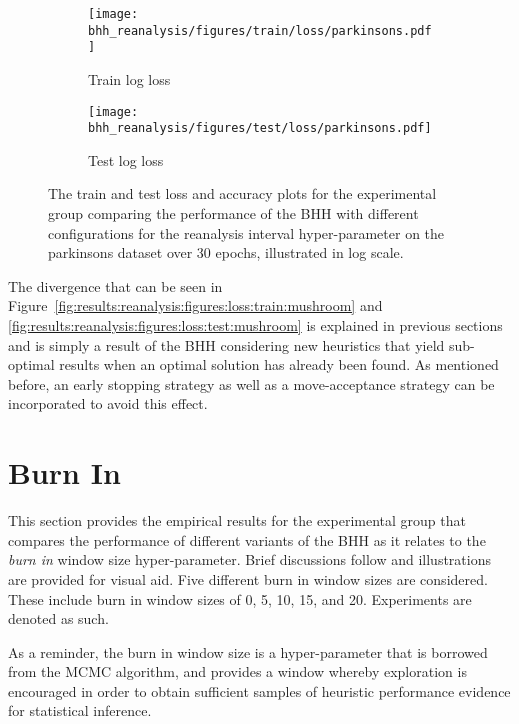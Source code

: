\begin{figure}[htb]
      \begin{subfigure}{0.5\textwidth}
            \centering
            \texttt{[image: bhh\_reanalysis/figures/train/loss/parkinsons.pdf]}
            \caption{Train log loss}
            \label{fig:results:reanalysis:figures:loss:train:parkinsons}
      \end{subfigure}
      \begin{subfigure}{0.5\textwidth}
            \centering
            \texttt{[image: bhh\_reanalysis/figures/test/loss/parkinsons.pdf]}
            \caption{Test log loss}
            \label{fig:results:reanalysis:figures:loss:test:parkinsons}
      \end{subfigure}
      \par\bigskip
      \caption{The train and test loss and accuracy plots for the experimental group comparing the performance of the \acs{BHH} with different configurations for the reanalysis interval hyper-parameter on the parkinsons dataset over 30 epochs, illustrated in log scale.}
      \label{fig:results:reanalysis:figures:parkinsons}
\end{figure}

The divergence that can be seen in Figure~\ref{fig:results:reanalysis:figures:loss:train:mushroom} and \ref{fig:results:reanalysis:figures:loss:test:mushroom} is explained in previous sections and is simply a result of the \acs{BHH} considering new heuristics that yield sub-optimal results when an optimal solution has already been found. As mentioned before, an early stopping strategy as well as a move-acceptance strategy can be incorporated to avoid this effect.

\section{Burn In}\label{sec:results:burn_in}

This section provides the empirical results for the experimental group that compares the performance of different variants of the \acs{BHH} as it relates to the \textit{burn in} window size hyper-parameter. Brief discussions follow and illustrations are provided for visual aid. Five different burn in window sizes are considered. These include burn in window sizes of 0, 5, 10, 15, and 20. Experiments are denoted as such.

As a reminder, the burn in window size is a hyper-parameter that is borrowed from the \acs{MCMC} algorithm, and provides a window whereby exploration is encouraged in order to obtain sufficient samples of heuristic performance evidence for statistical inference.

